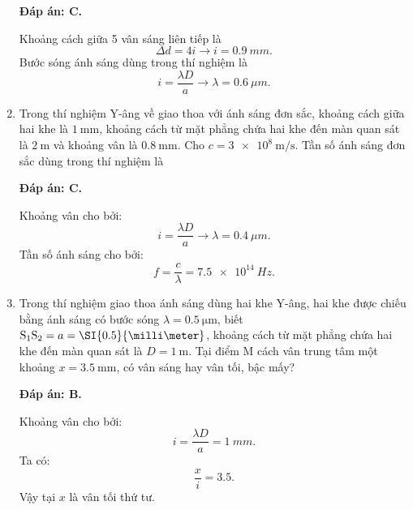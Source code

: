 \begin{enumerate}[label=\bfseries Câu \arabic*:]
	\loigiai
	{		\textbf{Đáp án: C.}
	
Khoảng cách giữa 5 vân sáng liên tiếp là
$$
	\Delta d = 4i \rightarrow i = \SI{0,9}{mm}.
$$
Bước sóng ánh sáng dùng trong thí nghiệm là
$$
	i = \dfrac{\lambda D}{a} \rightarrow \lambda = \SI{0,6}{\mu m}.
$$
		
	}
	
	\item {} 
		\cauhoi
	{Trong thí nghiệm Y-âng về giao thoa với ánh sáng đơn sắc, khoảng cách giữa hai khe là $\SI{1}{\milli \meter}$, khoảng cách từ mặt phẳng chứa hai khe đến màn quan sát là $\SI{2}{\meter}$ và khoảng vân là $\SI{0.8}{\milli \meter}$. Cho $c=\SI{3e8}{\meter / \second}$. Tần số ánh sáng đơn sắc dùng trong thí nghiệm là
	}
	
	\loigiai
	{		\textbf{Đáp án: C.}
		
Khoảng vân cho bởi:
$$
	i = \dfrac{\lambda D}{a} \rightarrow \lambda = \SI{0,4}{\mu m}.
$$
Tần số ánh sáng cho bởi:
$$
	f = \dfrac{c}{\lambda} = \SI{7,5 e14}{Hz}.
$$
		
	}
	
\item {} 
		\cauhoi
	{Trong thí nghiệm giao thoa ánh sáng dùng hai khe Y-âng, hai khe được chiếu bằng ánh sáng có bước sóng $\lambda=\SI{0.5}{\micro \meter}$, biết $\text S_1 \text S_2 = a = \SI{0.5}{\milli \meter}$, khoảng cách từ mặt phẳng chứa hai khe đến màn quan sát là $D=\SI{1}{\meter}$. Tại điểm M cách vân trung tâm một khoảng $x=\SI{3.5}{\milli \meter}$, có vân sáng hay vân tối, bậc mấy?
	}
	
	\loigiai
	{		\textbf{Đáp án: B.}
		
Khoảng vân cho bởi:
$$
	i = \dfrac{\lambda D}{a} = \SI{1}{mm}.
$$
Ta có:
$$
	\dfrac{x}{i} = \num{3,5}.
$$
Vậy tại $ x $ là vân tối thứ tư.
	}
	

\end{enumerate}
